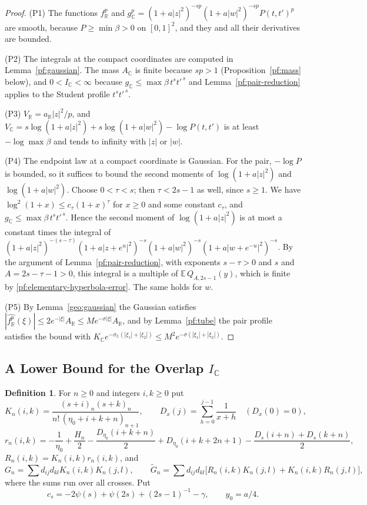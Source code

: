 \documentclass[11pt]{amsart}
\numberwithin{equation}{section}
\theoremstyle{definition}
\newtheorem{definition}[equation]{Definition}
\theoremstyle{remark}
\newcommand{\R}{\mathbb R}
\newcommand{\C}{\mathbb C}
\begin{document}
\begin{proof}
(P1) The functions $f_\R^p$ and
$g_\C^p=(1+a|z|^2)^{-sp}(1+a|w|^2)^{-sp}P(t,t')^p$ are smooth, because
$P\ge\min\beta>0$ on $[0,1]^2$, and they and all their derivatives are
bounded.

(P2) The integrals at the compact coordinates are computed in
Lemma~\ref{pf:gaussian}. The mass $A_\C$ is finite because $sp>1$
(Proposition~\ref{pf:mass} below), and $0<I_\C<\infty$ because
$g_\C\le\max\beta\,t^st'^{\,s}$ and Lemma~\ref{pf:pair-reduction}
applies to the Student profile $t^st'^{\,s}$.

(P3) $V_\R=a_\R|z|^2/p$, and
$V_\C=s\log(1+a|z|^2)+s\log(1+a|w|^2)-\log P(t,t')$ is at least
$-\log\max\beta$ and tends to infinity with $|z|$ or $|w|$.

(P4) The endpoint law at a compact coordinate is Gaussian. For the pair,
$-\log P$ is bounded, so it suffices to bound the second moments of
$\log(1+a|z|^2)$ and $\log(1+a|w|^2)$. Choose $0<\tau<s$; then
$\tau<2s-1$ as well, since $s\ge1$. We have
$\log^2(1+x)\le c_\tau(1+x)^\tau$ for $x\ge0$ and some constant
$c_\tau$, and $g_\C\le\max\beta\,t^st'^{\,s}$. Hence the second moment
of $\log(1+a|z|^2)$ is at most a constant times the integral of
$(1+a|z|^2)^{-(s-\tau)}(1+a|z+e^u|^2)^{-s}(1+a|w|^2)^{-s}
(1+a|w+e^{-u}|^2)^{-s}$. By the argument of
Lemma~\ref{pf:pair-reduction}, with exponents $s-\tau>0$ and $s$ and
$A=2s-\tau-1>0$, this integral is a multiple of
$\mathbb E\,Q_{A,2s-1}(y)$, which is finite by
\eqref{pf:elementary-hyperbola-error}. The same holds for $w$.

(P5) By Lemma~\ref{geo:gaussian} the Gaussian satisfies
$|\widehat{f_\R^p}(\xi)|\le2e^{-|\xi|}A_\R\le Me^{-\sigma|\xi|}A_\R$, and by
Lemma~\ref{pf:tube} the pair profile satisfies the bound with
$K_\C e^{-\sigma_\C(|\xi_1|+|\xi_2|)}\le
M^2e^{-\sigma(|\xi_1|+|\xi_2|)}$.
\end{proof}

\subsection{\texorpdfstring{A Lower Bound for the Overlap $I_\C$}{A Lower Bound for the Overlap}}

\begin{definition}\label{pf:overlap-coefficients}
For $n\ge0$ and integers $i,k\ge0$ put
\[
 K_n(i,k)=\frac{(s+i)_n(s+k)_n}{n!\,(\eta_0+i+k+n)_{n+1}},\qquad
 D_x(j)=\sum_{h=0}^{j-1}\frac1{x+h}\quad(D_x(0)=0),
\]
\[
 r_n(i,k)=-\frac1{\eta_0}+\frac{H_n}2-\frac{D_{\eta_0}(i+k+n)}2
 +D_{\eta_0}(i+k+2n+1)-\frac{D_s(i+n)+D_s(k+n)}2,
\]
$R_n(i,k)=K_n(i,k)r_n(i,k)$, and
\[
 G_n=\sum d_{ij}d_{kl}K_n(i,k)K_n(j,l),\qquad
 \widetilde G_n=\sum d_{ij}d_{kl}\bigl[R_n(i,k)K_n(j,l)+K_n(i,k)R_n(j,l)\bigr],
\]
where the sums run over all crosses. Put
\begin{equation}\label{pf:student-constant}
 c_s=-2\psi(s)+\psi(2s)+(2s-1)^{-1}-\gamma ,\qquad y_0=a/4 .
\end{equation}
\end{definition}
\end{document}
